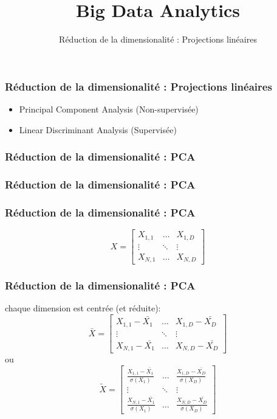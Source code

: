 \documentclass{formation}
\title{Big Data Analytics}
\subtitle{Réduction de la dimensionalité : Projections linéaires}
\begin{document}
\maketitle

\begin{frame}
  \frametitle{Réduction de la dimensionalité : Projections linéaires}
    \begin{itemize}
    \item Principal Component Analysis (Non-supervisée)
    \item Linear Discriminant Analysis (Supervisée)
    \end{itemize}
\end{frame}

\begin{frame}
  \frametitle{Réduction de la dimensionalité : PCA}
\end{frame}

\begin{frame}
  \frametitle{Réduction de la dimensionalité : PCA}
\end{frame}

\begin{frame}
  \frametitle{Réduction de la dimensionalité : PCA}
  \[
  X = \begin{bmatrix}
    X_{1,1} & \dots  & X_{1,D} \\
    \vdots & \ddots & \vdots \\
    X_{N,1} & \dots  & X_{N,D}
  \end{bmatrix}
  \]
\end{frame}

\begin{frame}
  \frametitle{Réduction de la dimensionalité : PCA}
  chaque dimension est centrée (et réduite):
  \[
  \bar{X} =
  \begin{bmatrix}
    X_{1,1}-\bar{X_1} & \dots  & X_{1,D}-\bar{X_D} \\
    \vdots & \ddots & \vdots \\
    X_{N,1}-\bar{X_1} & \dots  & X_{N,D}-\bar{X_D}
  \end{bmatrix}
  \]
  ou
  \[
  \tilde{X} =
  \begin{bmatrix}
    \frac{X_{1,1}-\bar{X_1}}{\sigma(X_1)} & \dots  & \frac{X_{1,D}-\bar{X_D}}{\sigma(X_D)} \\
    \vdots & \ddots & \vdots \\
    \frac{X_{N,1}-\bar{X_1}}{\sigma(X_1)} & \dots  & \frac{X_{N,D}-\bar{X_D}}{\sigma(X_D)}
  \end{bmatrix}
  \]
\end{frame}
\end{document}
